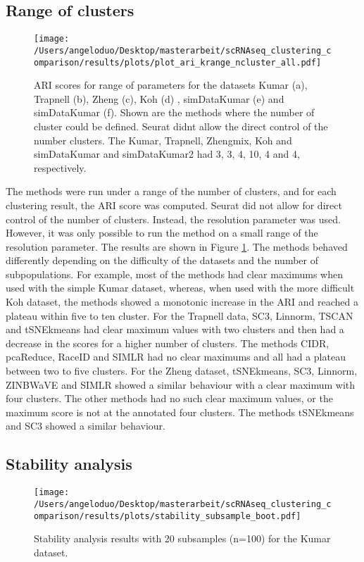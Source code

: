\documentclass[12pt, a4paper]{article}\usepackage[]{graphicx}\usepackage[]{color}
\begin{document}
\subsection{Range of clusters}
\begin{figure}[H]
\centering
\texttt{[image: /Users/angeloduo/Desktop/masterarbeit/scRNAseq\_clustering\_comparison/results/plots/plot\_ari\_krange\_ncluster\_all.pdf]}
\caption{ARI scores for range of parameters for the datasets Kumar (a), Trapnell (b), Zheng (c), Koh (d) , simDataKumar (e) and simDataKumar (f). Shown are the methods where the number of cluster could be defined. Seurat didnt allow the direct control of the number clusters. The Kumar, Trapnell, Zhengmix, Koh and simDataKumar and simDataKumar2 had 3, 3, 4, 10, 4 and 4, respectively.}
\label{fig:arirangeall}
\end{figure}
The methods were run under a range of the number of clusters, and for each clustering result, the ARI score was computed. Seurat did not allow for direct control of the number of clusters. Instead, the resolution parameter was used. However, it was only possible to run the method on a small range of the resolution parameter. The results are shown in Figure \ref{fig:arirangeall}. The methods behaved differently depending on the difficulty of the datasets and the number of subpopulations. For example, most of the methods had clear maximums when used with the simple Kumar dataset, whereas, when used with the more difficult Koh dataset, the methods showed a monotonic increase in the ARI and reached a plateau within five to ten cluster. For the Trapnell data, SC3, Linnorm, TSCAN and tSNEkmeans had clear maximum values with two clusters and then had a decrease in the scores for a higher number of clusters. The methods CIDR, pcaReduce, RaceID and SIMLR had no clear maximums and all had a plateau between two to five clusters. For the Zheng dataset, tSNEkmeans, SC3, Linnorm, ZINBWaVE and SIMLR showed a similar behaviour with a clear maximum with four clusters. The other methods had no such clear maximum values, or the maximum score is not at the annotated four clusters. The methods tSNEkmeans and SC3 showed a similar behaviour.


\subsection{Stability analysis}
\begin{figure}[H]
\centering
\texttt{[image: /Users/angeloduo/Desktop/masterarbeit/scRNAseq\_clustering\_comparison/results/plots/stability\_subsample\_boot.pdf]}
\caption{Stability analysis results with 20 subsamples (n=100) for the Kumar dataset.}
\label{fig:stab}
\end{figure}
\end{document}
